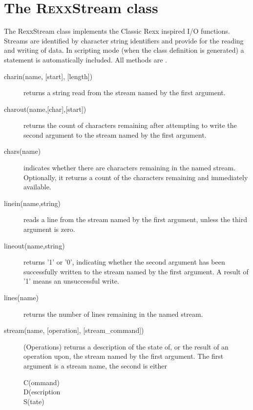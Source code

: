 \section{The R\textsc{exx}Stream class}\label{refrexxstream}

The RexxStream class implements the Classic Rexx inspired I/O
functions. Streams are identified by character string identifiers and
provide for the reading and writing of data. In scripting mode (when
the class definition is generated) a  statement is
automatically included. All methods are .

\begin{description}
  
\item[charin(name, [start{]}, [length{]})] returns a string read from the stream named by the first
argument.

\item[charout(name,[char{]},[start{]})] returns the count of characters remaining after attempting to
write the second argument to the stream named by the first argument.

\item[chars(name)] indicates whether there are characters remaining in the named
stream. Optionally, it returns a count of the characters remaining and
immediately available.

\item[linein(name,string)] reads a line from the stream named by the first argument,
unless the third argument is zero.

\item[lineout(name,string)] returns '1' or '0', indicating whether the second argument has been successfully written to the stream named by the first argument. A result of '1' means an unsuccessful write.

\item[lines(name)] returns the number of lines remaining in the named stream.

\item[stream(name, [operation{]}, [stream\_command{]})] (Operations) returns a description of the state of, or the result of an
operation upon, the stream named by the first argument. The first
argument is a stream name, the second is either
\begin{description}
\item[C(ommand)]
\item[D(escription]
\item[S(tate)]
\end{description}


\end{description}
